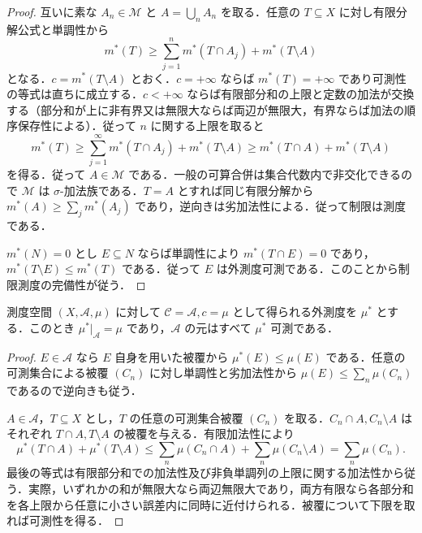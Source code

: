 \begin{proof}
互いに素な $A_n\in\mathcal M$ と $A=\bigcup_n A_n$ を取る．任意の $T\subseteq X$ に対し有限分解公式と単調性から
\[
 m^*(T)\geq\sum_{j=1}^n m^*(T\cap A_j)+m^*(T\setminus A)
\]
となる．$c=m^*(T\setminus A)$ とおく．$c=+\infty$ ならば $m^*(T)=+\infty$ であり可測性の等式は直ちに成立する．$c<+\infty$ ならば有限部分和の上限と定数の加法が交換する（部分和が上に非有界又は無限大ならば両辺が無限大，有界ならば加法の順序保存性による）．従って $n$ に関する上限を取ると
\[
 m^*(T)\geq\sum_{j=1}^\infty m^*(T\cap A_j)+m^*(T\setminus A)
 \geq m^*(T\cap A)+m^*(T\setminus A)
\]
を得る．従って $A\in\mathcal M$ である．一般の可算合併は集合代数内で非交化できるので $\mathcal M$ は $\sigma$-加法族である．$T=A$ とすれば同じ有限分解から $m^*(A)\geq\sum_j m^*(A_j)$ であり，逆向きは劣加法性による．従って制限は測度である．

$m^*(N)=0$ とし $E\subseteq N$ ならば単調性により $m^*(T\cap E)=0$ であり，$m^*(T\setminus E)\leq m^*(T)$ である．従って $E$ は外測度可測である．このことから制限測度の完備性が従う．
\end{proof}
\begin{prop}[測度から誘導される外測度]
測度空間 $(X,\mathcal A,\mu)$ に対して $\mathcal C=\mathcal A,c=\mu$ として得られる外測度を $\mu^*$ とする．このとき $\mu^*|_{\mathcal A}=\mu$ であり，$\mathcal A$ の元はすべて $\mu^*$ 可測である．
\end{prop}
\begin{proof}
$E\in\mathcal A$ なら $E$ 自身を用いた被覆から $\mu^*(E)\leq\mu(E)$ である．任意の可測集合による被覆 $(C_n)$ に対し単調性と劣加法性から $\mu(E)\leq\sum_n\mu(C_n)$ であるので逆向きも従う．

$A\in\mathcal A$，$T\subseteq X$ とし，$T$ の任意の可測集合被覆 $(C_n)$ を取る．$C_n\cap A,C_n\setminus A$ はそれぞれ $T\cap A,T\setminus A$ の被覆を与える．有限加法性により
\[
 \mu^*(T\cap A)+\mu^*(T\setminus A)\leq
 \sum_n\mu(C_n\cap A)+\sum_n\mu(C_n\setminus A)
 =\sum_n\mu(C_n).
\]
最後の等式は有限部分和での加法性及び非負単調列の上限に関する加法性から従う．実際，いずれかの和が無限大なら両辺無限大であり，両方有限なら各部分和を各上限から任意に小さい誤差内に同時に近付けられる．被覆について下限を取れば可測性を得る．
\end{proof}
